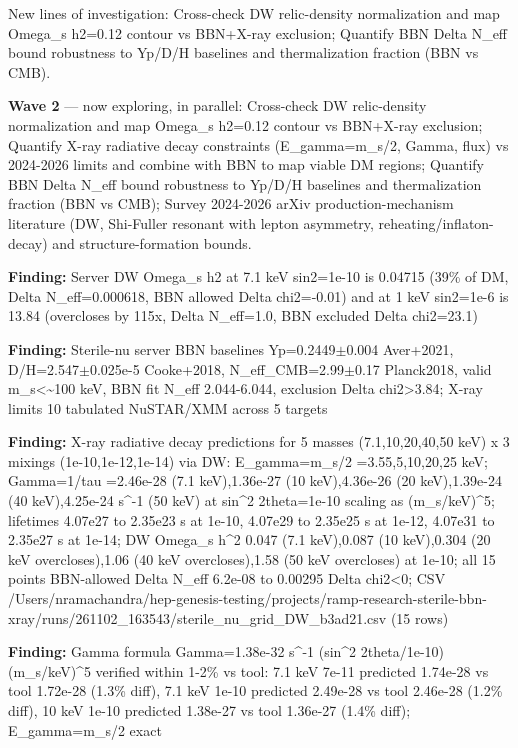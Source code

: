 \documentclass[11pt,a4paper]{article}
\begin{document}
New lines of investigation: Cross-check DW relic-density normalization and map Omega\_s h2=0.12 contour vs BBN+X-ray exclusion; Quantify BBN Delta N\_eff bound robustness to Yp/D/H baselines and thermalization fraction (BBN vs CMB).

\textbf{Wave 2} --- now exploring, in parallel: Cross-check DW relic-density normalization and map Omega\_s h2=0.12 contour vs BBN+X-ray exclusion; Quantify X-ray radiative decay constraints (E\_gamma=m\_s/2, Gamma, flux) vs 2024-2026 limits and combine with BBN to map viable DM regions; Quantify BBN Delta N\_eff bound robustness to Yp/D/H baselines and thermalization fraction (BBN vs CMB); Survey 2024-2026 arXiv production-mechanism literature (DW, Shi-Fuller resonant with lepton asymmetry, reheating/inflaton-decay) and structure-formation bounds.

\textbf{Finding:} Server DW Omega\_s h2 at 7.1 keV sin2=1e-10 is 0.04715 (39\% of DM, Delta N\_eff=0.000618, BBN allowed Delta chi2=-0.01) and at 1 keV sin2=1e-6 is 13.84 (overcloses by 115x, Delta N\_eff=1.0, BBN excluded Delta chi2=23.1)

\textbf{Finding:} Sterile-nu server BBN baselines Yp=0.2449$\pm$0.004 Aver+2021, D/H=2.547$\pm$0.025e-5 Cooke+2018, N\_eff\_CMB=2.99$\pm$0.17 Planck2018, valid m\_s\textless{}\textasciitilde{}100 keV, BBN fit N\_eff 2.044-6.044, exclusion Delta chi2\textgreater{}3.84; X-ray limits 10 tabulated NuSTAR/XMM across 5 targets

\textbf{Finding:} X-ray radiative decay predictions for 5 masses (7.1,10,20,40,50 keV) x 3 mixings (1e-10,1e-12,1e-14) via DW: E\_gamma=m\_s/2 =3.55,5,10,20,25 keV; Gamma=1/tau =2.46e-28 (7.1 keV),1.36e-27 (10 keV),4.36e-26 (20 keV),1.39e-24 (40 keV),4.25e-24 s\textasciicircum{}-1 (50 keV) at sin\textasciicircum{}2 2theta=1e-10 scaling as (m\_s/keV)\textasciicircum{}5; lifetimes 4.07e27 to 2.35e23 s at 1e-10, 4.07e29 to 2.35e25 s at 1e-12, 4.07e31 to 2.35e27 s at 1e-14; DW Omega\_s h\textasciicircum{}2 0.047 (7.1 keV),0.087 (10 keV),0.304 (20 keV overcloses),1.06 (40 keV overcloses),1.58 (50 keV overcloses) at 1e-10; all 15 points BBN-allowed Delta N\_eff 6.2e-08 to 0.00295 Delta chi2\textless{}0; CSV /Users/nramachandra/hep-genesis-testing/projects/ramp-research-sterile-bbn-xray/runs/261102\_163543/sterile\_nu\_grid\_DW\_b3ad21.csv (15 rows)

\textbf{Finding:} Gamma formula Gamma=1.38e-32 s\textasciicircum{}-1 (sin\textasciicircum{}2 2theta/1e-10)(m\_s/keV)\textasciicircum{}5 verified within 1-2\% vs tool: 7.1 keV 7e-11 predicted 1.74e-28 vs tool 1.72e-28 (1.3\% diff), 7.1 keV 1e-10 predicted 2.49e-28 vs tool 2.46e-28 (1.2\% diff), 10 keV 1e-10 predicted 1.38e-27 vs tool 1.36e-27 (1.4\% diff); E\_gamma=m\_s/2 exact
\end{document}
